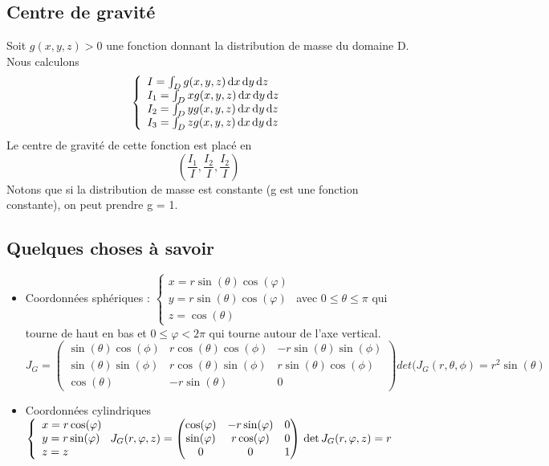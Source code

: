 \documentclass[12pt,a4paper]{article}
\renewcommand{\)}{\right)}
\renewcommand{\(}{\left(}
\begin{document}
\subsection{Centre de gravité}
Soit $g(x,y,z) > 0$ une fonction donnant la distribution de masse du domaine D. Nous calculons
\[\left\{\begin{array}{l}
I = \int_D g(x,y,z) \, \mathrm d x\, \mathrm d y\, \mathrm d z\\
I_1 = \int_D xg(x,y,z) \, \mathrm d x\, \mathrm d y\, \mathrm d z\\
I_2 = \int_D yg(x,y,z) \, \mathrm d x\, \mathrm d y\, \mathrm d z\\
I_3 = \int_D zg(x,y,z) \, \mathrm d x\, \mathrm d y\, \mathrm d z\\
\end{array}\right.\]
Le centre de gravité de cette fonction est placé en
\[\(\frac{I_1}{I},\frac{I_2}{I},\frac{I_2}{I}\)\]
Notons que si la distribution de masse est constante (g est une fonction constante), on peut prendre g = 1.

\subsection{Quelques choses à savoir}
\begin{itemize}
	\item 	Coordonnées sphériques : 
			$\left\{\begin{array}{l}
				x = r\sin(\theta)\cos(\varphi)\\
				y = r\sin(\theta)\cos(\varphi)\\
				z =\cos(\theta)
			\end{array}\right.$
			avec $0 \leq \theta \leq \pi$ qui tourne de haut en bas et $0\leq \varphi < 2\pi$ qui tourne autour de l'axe vertical.\\
			$J_G = 
			\begin{pmatrix}
				\sin(\theta)\cos(\phi) & r\cos(\theta)\cos(\phi) & -r\sin(\theta)\sin(\phi)\\
				\sin(\theta)\sin(\phi) & r\cos(\theta)\sin(\phi) & r\sin(\theta)\cos(\phi)\\
				\cos(\theta) & -r\sin(\theta) & 0
			\end{pmatrix} det(J_G(r,\theta,\phi) = r^2 \sin(\theta)$
	\item 	Coordonnées cylindriques
			$\left\{\begin{array}{l}
				x = r\cos(\varphi)\\
				y = r\sin(\varphi)\\
				z = z
			\end{array}\right. J_G(r,\varphi,z) = 
			\begin{pmatrix}
				\cos(\varphi) & -r\sin(\varphi) & 0\\
				\sin(\varphi) & r\cos(\varphi) & 0\\
				0 & 0 & 1
			\end{pmatrix} \\
			\det J_G(r,\varphi,z) = r$
\end{itemize}
\end{document}
